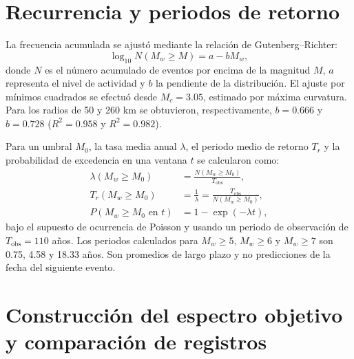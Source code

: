 \documentclass[12pt,oneside]{report}
\begin{document}
\section{Recurrencia y periodos de retorno}
\label{app:recurrencia}

La frecuencia acumulada se ajustó mediante la relación de Gutenberg--Richter:
\begin{equation}
    \log_{10}N(M_w\geq M)=a-bM_w,
\end{equation}
donde $N$ es el número acumulado de eventos por encima de la magnitud $M$,
$a$ representa el nivel de actividad y $b$ la pendiente de la distribución.
El ajuste por mínimos cuadrados se efectuó desde $M_c=3.05$, estimado por
máxima curvatura. Para los radios de 50 y 260 km se obtuvieron, respectivamente,
$b=0.666$ y $b=0.728$ ($R^2=0.958$ y $R^2=0.982$).

Para un umbral $M_0$, la tasa media anual $\lambda$, el periodo medio de retorno
$T_r$ y la probabilidad de excedencia en una ventana $t$ se calcularon como:
\begin{align}
    \lambda(M_w\geq M_0)&=\frac{N(M_w\geq M_0)}{T_{\mathrm{obs}}},\\
    T_r(M_w\geq M_0)&=\frac{1}{\lambda}
    =\frac{T_{\mathrm{obs}}}{N(M_w\geq M_0)},\\
    P(M_w\geq M_0\text{ en }t)&=1-\exp(-\lambda t),
\end{align}
bajo el supuesto de ocurrencia de Poisson y usando un periodo de observación
de $T_{\mathrm{obs}}=110$ años. Los periodos calculados para $M_w\geq5$, $M_w\geq6$
y $M_w\geq7$ son 0.75, 4.58 y 18.33 años. Son promedios de largo plazo y no
predicciones de la fecha del siguiente evento.

\section{Construcción del espectro objetivo y comparación de registros}
\label{app:espectros}
\end{document}
